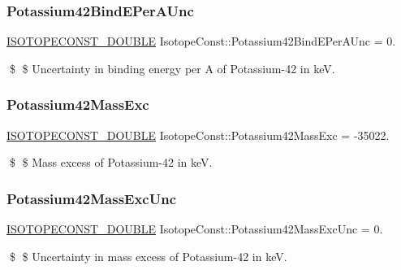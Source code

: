 \subsubsection{\texorpdfstring{Potassium42\+Bind\+E\+Per\+A\+Unc}{Potassium42BindEPerAUnc}}
{\footnotesize\ttfamily \mbox{\hyperlink{group___isotope_const-_macros_ga8f45a7272ce02c0b4c65c44636ed719a}{I\+S\+O\+T\+O\+P\+E\+C\+O\+N\+S\+T\+\_\+\+D\+O\+U\+B\+LE}} Isotope\+Const\+::\+Potassium42\+Bind\+E\+Per\+A\+Unc = 0.}

\$ \$ Uncertainty in binding energy per A of Potassium-\/42 in keV. \mbox{\label{group___isotope_const-_potassium-_k42_ga7603301904f6ab7c12ff05e610517a49}} 
\subsubsection{\texorpdfstring{Potassium42\+Mass\+Exc}{Potassium42MassExc}}
{\footnotesize\ttfamily \mbox{\hyperlink{group___isotope_const-_macros_ga8f45a7272ce02c0b4c65c44636ed719a}{I\+S\+O\+T\+O\+P\+E\+C\+O\+N\+S\+T\+\_\+\+D\+O\+U\+B\+LE}} Isotope\+Const\+::\+Potassium42\+Mass\+Exc = -\/35022.}

\$ \$ Mass excess of Potassium-\/42 in keV. \mbox{\label{group___isotope_const-_potassium-_k42_gac458f7700da98b565b855f395a7a348e}} 
\subsubsection{\texorpdfstring{Potassium42\+Mass\+Exc\+Unc}{Potassium42MassExcUnc}}
{\footnotesize\ttfamily \mbox{\hyperlink{group___isotope_const-_macros_ga8f45a7272ce02c0b4c65c44636ed719a}{I\+S\+O\+T\+O\+P\+E\+C\+O\+N\+S\+T\+\_\+\+D\+O\+U\+B\+LE}} Isotope\+Const\+::\+Potassium42\+Mass\+Exc\+Unc = 0.}

\$ \$ Uncertainty in mass excess of Potassium-\/42 in keV. \mbox{\label{group___isotope_const-_potassium-_k42_gaf93312c440c9db1ed06d219ea83d281e}} 
